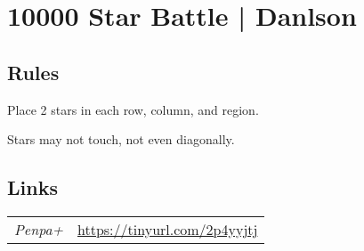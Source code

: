 \section{10000 Star Battle | {\normalfont Danlson}}
\label{sec:32-10000-star-battle-danlson}

\begin{multicols}{2}
\subsection*{Rules}
\begin{markdown}
Place 2 stars in each row, column, and region.

Stars may not touch, not even diagonally.
\end{markdown}
\subsection*{Links}
\begin{tabularx}{\textwidth}{l X}
\emph{Penpa+} & \url{https://tinyurl.com/2p4yyjtj} \\
\end{tabularx}
\end{multicols}
\pagebreak
